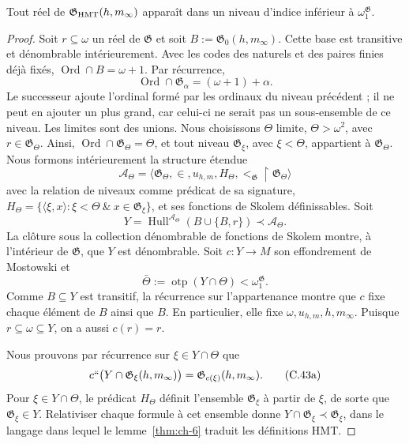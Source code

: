 \begin{lemma}
\label{thm:ch-8}
Tout réel de
\(\mathfrak G_{\rm HMT}(h,m_\infty)\) apparaît dans un niveau d’indice inférieur à
\(\omega_1^{\mathfrak G}\).

\end{lemma}
\begin{proof}
Soit \(r\subseteq\omega\) un réel de \(\mathfrak G\) et soit
\(B:=\mathfrak G_0(h,m_\infty)\). Cette base est transitive et dénombrable
intérieurement. Avec les codes des naturels et des paires finies déjà fixés,
\(\operatorname{Ord}\cap B=\omega+1\). Par récurrence,
\[
 \operatorname{Ord}\cap\mathfrak G_\alpha=(\omega+1)+\alpha.
\]
Le successeur ajoute l’ordinal formé par les ordinaux du niveau précédent ;
il ne peut en ajouter un plus grand, car celui-ci ne serait pas un sous-ensemble de ce niveau. Les
limites sont des unions. Nous choisissons \(\Theta\) limite, \(\Theta>\omega^2\),
avec \(r\in\mathfrak G_\Theta\). Ainsi,
\(\operatorname{Ord}\cap\mathfrak G_\Theta=\Theta\), et tout niveau
\(\mathfrak G_\xi\), avec \(\xi<\Theta\), appartient à
\(\mathfrak G_\Theta\). Nous formons intérieurement la structure étendue
\[
 \mathcal A_\Theta=
 \langle\mathfrak G_\Theta,\in,u_{h,m},
         H_\Theta,<_{\mathfrak G}\!\upharpoonright\mathfrak G_\Theta\rangle
\]
avec la relation de niveaux comme prédicat de sa signature,
\(H_\Theta=\{\langle\xi,x\rangle:\xi<\Theta\ \&\
x\in\mathfrak G_\xi\}\), et ses fonctions de Skolem définissables. Soit
\[
 Y=\operatorname{Hull}^{\mathcal A_\Theta}
   (B\cup\{B,r\})\prec\mathcal A_\Theta .
\]
La clôture sous la collection dénombrable de fonctions de Skolem montre, à l'intérieur de \(\mathfrak G\), que \(Y\) est dénombrable. Soit \(c:Y\rightarrow M\) son effondrement de Mostowski et
\[
 \bar\Theta:=\operatorname{otp}(Y\cap\Theta)
 <\omega_1^{\mathfrak G}.
\]
Comme \(B\subseteq Y\) est transitif, la récurrence sur l’appartenance montre
que \(c\) fixe chaque élément de \(B\) ainsi que \(B\). En particulier,
elle fixe \(\omega,u_{h,m},h,m_\infty\). Puisque
\(r\subseteq\omega\subseteq Y\), on a aussi \(c(r)=r\).

Nous prouvons par récurrence sur \(\xi\in Y\cap\Theta\) que
\[
 c``\bigl(Y\cap\mathfrak G_\xi(h,m_\infty)\bigr)
 =\mathfrak G_{c(\xi)}(h,m_\infty).
\tag{C.43a}\label{eq:ch-condensacion}
\]
Pour \(\xi\in Y\cap\Theta\), le prédicat \(H_\Theta\) définit
l’ensemble \(\mathfrak G_\xi\) à partir de \(\xi\), de sorte que
\(\mathfrak G_\xi\in Y\). Relativiser chaque formule à cet ensemble donne
\(Y\cap\mathfrak G_\xi\prec\mathfrak G_\xi\), dans le langage dans lequel
le lemme~\ref{thm:ch-6} traduit les définitions HMT.


\end{proof}
